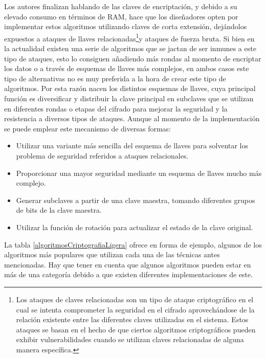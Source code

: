 \documentclass[a4paper,10pt]{article}
\begin{document}
	Los autores finalizan hablando de las claves de encriptación, y debido a su elevado consumo en términos de RAM, hace que los diseñadores opten por implementar estos algoritmos utilizando claves de corta extensión, dejándolos expuestos a ataques de llaves relacionadas\footnote{Los ataques de claves relacionadas son un tipo de ataque criptográfico en el cual se intenta comprometer la seguridad en el cifrado aprovechándose de la relación existente entre las diferentes claves utilizadas en el sistema. Estos ataques se basan en el hecho de que ciertos algoritmos criptográficos pueden exhibir vulnerabilidades cuando se utilizan claves relacionadas de alguna manera específica.}y ataques de fuerza bruta. Si bien en la actualidad existen una serie de algoritmos que se jactan de ser inmunes a este tipo de ataques, esto lo consiguen añadiendo más rondas al momento de encriptar los datos o a través de esquemas de llaves más complejos, en ambos casos este tipo de alternativas no es muy preferida a la hora de crear este tipo de algoritmos. Por esta razón nacen los distintos esquemas de llaves, cuya principal función es diversificar y distribuir la clave principal en subclaves que se utilizan en diferentes rondas o etapas del cifrado para mejorar la seguridad y la resistencia a diversos tipos de ataques. Aunque al momento de la implementación se puede emplear este mecanismo de diversas formas:
	\begin{itemize}
		\item Utilizar una variante más sencilla del esquema de llaves para solventar los problema de seguridad referidos a ataques relacionales.
		\item Proporcionar una mayor seguridad mediante un esquema de llaves mucho más complejo.
		\item Generar subclaves a partir de una clave maestra, tomando diferentes grupos de bits de la clave maestra.
		\item Utilizar la función de rotación para actualizar el estado de la clave original.
	\end{itemize}
	La tabla \ref{algoritmosCriptografiaLigera} ofrece en forma de ejemplo, algunos de los algoritmos más populares que utilizan cada una de las técnicas antes mencionadas. Hay que tener en cuenta que algunos algoritmos pueden estar en más de una categoría debido a que existen diferentes implementaciones de este.
\end{document}
